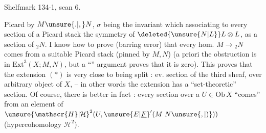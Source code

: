 Shelfmark 134-1, scan 6.

\margin{\mbox{-- --}}

Picard   by $M\unsure{.|,}N$, $\sigma$ being the invariant which  associating to every section  of a Picard stack the symmetry of $\deleted{\unsure{N|L}}L\otimes L$,  as a section of ${}_{2}N$. I know how to prove (barring error) that every hom. $M\to{}_{2}N$ comes from a suitable Picard stack (pinned by $M,N$) (a priori the obstruction is in $\mathrm{Ext}^{3}(X;M,N)$, but a ``'' argument proves that it is zero). This proves that the extension $(*)$ is very close to being split :  ev. section of the third sheaf, over  arbitrary object of $X$,  -- in other words the extension has a ``set-theoretic'' section. Of course, there is better in fact : every section over a $U\in\mathrm{Ob}\,X$ ``comes'' from an element of ${\unsure{\mathscr{H}|\mathcal{H}}}^{2}(U,{\unsure{E|\underline{F}}}'(M\;N\unsure{,|)}))$ (hypercohomology $\mathscr{H}^{2}$).

